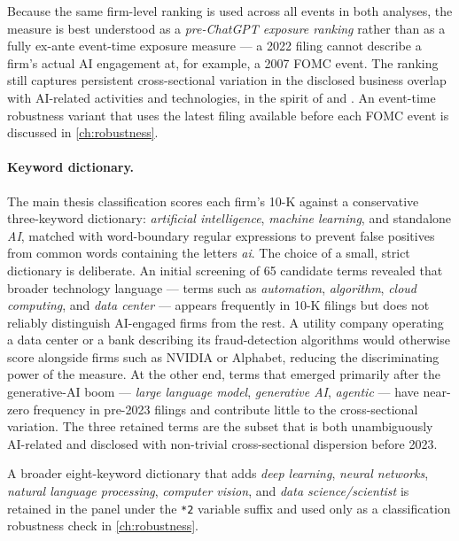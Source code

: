 Because the same firm-level ranking is used across all events in both analyses, the measure is best understood as a \emph{pre-ChatGPT exposure ranking} rather than as a fully ex-ante event-time exposure measure --- a 2022 filing cannot describe a firm's actual AI engagement at, for example, a 2007 FOMC event. The ranking still captures persistent cross-sectional variation in the disclosed business overlap with AI-related activities and technologies, in the spirit of \citet{davisHansenSeminarioAmez2020} and \citet{eisfeldtSchubertZhangTaska2023}. An event-time robustness variant that uses the latest filing available before each FOMC event is discussed in \cref{ch:robustness}.

\paragraph{Keyword dictionary.} The main thesis classification scores each firm's 10-K against a conservative three-keyword dictionary: \emph{artificial intelligence}, \emph{machine learning}, and standalone \emph{AI}, matched with word-boundary regular expressions to prevent false positives from common words containing the letters \emph{ai}. The choice of a small, strict dictionary is deliberate. An initial screening of 65 candidate terms revealed that broader technology language --- terms such as \emph{automation}, \emph{algorithm}, \emph{cloud computing}, and \emph{data center} --- appears frequently in 10-K filings but does not reliably distinguish AI-engaged firms from the rest. A utility company operating a data center or a bank describing its fraud-detection algorithms would otherwise score alongside firms such as NVIDIA or Alphabet, reducing the discriminating power of the measure. At the other end, terms that emerged primarily after the generative-AI boom --- \emph{large language model}, \emph{generative AI}, \emph{agentic} --- have near-zero frequency in pre-2023 filings and contribute little to the cross-sectional variation. The three retained terms are the subset that is both unambiguously AI-related and disclosed with non-trivial cross-sectional dispersion before 2023.

A broader eight-keyword dictionary that adds \emph{deep learning}, \emph{neural networks}, \emph{natural language processing}, \emph{computer vision}, and \emph{data science/scientist} is retained in the panel under the \texttt{*2} variable suffix and used only as a classification robustness check in \cref{ch:robustness}.

